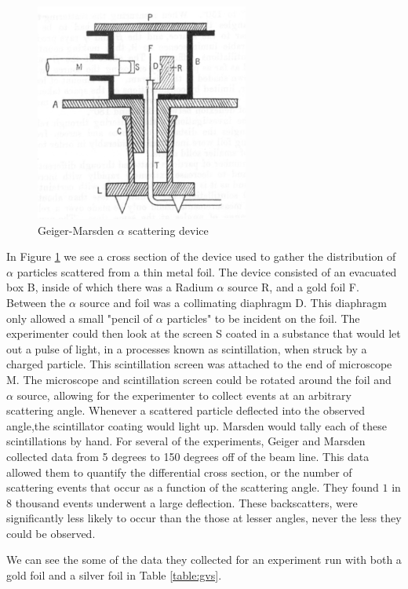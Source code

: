 \documentclass[12pt]{article}
\begin{document}
\begin{figure}[h]
    \centering
    \includegraphics[width=7cm]{gold_foil_device}
    \caption{Geiger-Marsden $\alpha$ scattering device\cite{Geiger1913}}
    \label{fig:device}
\end{figure}


In Figure \ref{fig:device} we see a cross section of the device used to gather the distribution of $\alpha$ particles scattered from a thin metal foil.
The device consisted of an evacuated box B, inside of which there was a Radium $\alpha$ source R, and a gold foil F.
Between the $\alpha$ source and foil was a collimating diaphragm D.
This diaphragm only allowed a small "pencil of $\alpha$ particles" to be incident on the foil.
The experimenter could then look at the screen S coated in a substance that would let out a pulse of light, in a processes known as scintillation, when struck by a charged particle.
This scintillation screen was attached to the end of microscope M.
The microscope and scintillation screen could be rotated around the foil and $\alpha$ source, allowing for the experimenter to collect events at an arbitrary scattering angle. 
Whenever a scattered particle deflected into the observed angle,the scintillator coating would light up. Marsden would tally each of these scintillations by hand.
For several of the experiments, Geiger and Marsden collected data from 5 degrees to 150 degrees off of the beam line.
This data allowed them to quantify the differential cross section, or the number of scattering events that occur as a function of the scattering angle.
They found $1$ in $8$ thousand events underwent a large deflection. 
These backscatters, were significantly less likely to occur than the those at lesser angles, never the less they could be observed.

We can see the some of the data they collected for an experiment run with both a gold foil and a silver foil in Table \ref{table:gvs}.
\end{document}
